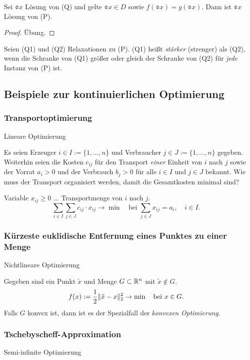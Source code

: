 \begin{thm}
  Sei $\obar{x}$ Lösung von (Q) und gelte $\obar{x} \in D$ sowie $f(\obar{x}) =
  g(\obar{x})$. Dann ist $\obar{x}$ Lösung von (P).
\end{thm}

\begin{proof}
  Übung.
\end{proof}

\begin{defn}
  Seien (Q1) und (Q2) Relaxationen zu (P). (Q1) heißt \emph{stärker} (strenger)
  als (Q2), wenn die Schranke von (Q1) größer oder gleich der Schranke von (Q2)
  für \emph{jede} Instanz von (P) ist.
\end{defn}

\subsection{Beispiele zur kontinuierlichen Optimierung}
\subsubsection{Transportoptimierung}
Lineare Optimierung

Es seien Erzeuger $i \in I := \{1, \ldots, n\}$ und Verbraucher $j \in J := \{1,
\ldots, n\}$ gegeben. Weiterhin seien die Kosten $c_{ij}$ für den Transport
\emph{einer} Einheit von $i$ nach $j$ sowie der Vorrat $a_i > 0$ und der
Verbrauch $b_j > 0$ für alle $i \in I$ und $j \in J$ bekannt. Wie muss der
Transport organisiert werden, damit die Gesamtkosten minimal sind?

Variable $x_{ij} \ge 0$ ... Transportmenge von $i$ nach $j$.
\[ \sum_{i \in I} \sum_{j \in J} c_{ij} \cdot x_{ij} \to \min \quad \text{bei }
  \sum_{j \in J} x_{ij} = a_i, \quad i \in I. \]

\subsubsection{Kürzeste euklidische Entfernung eines Punktes zu einer Menge}
Nichtlineare Optimierung

Gegeben sind ein Punkt $\tilde{x}$ und Menge $G \subset \mathbb{R}^n$ mit $\tilde{x}
\notin G$.
\[ f(x) := \frac{1}{2} \| \tilde{x} - x \|_2^2 \to \min \quad \text{bei } x \in
G. \]
Falls $G$ konvex ist, dann ist es der Spezialfall der \emph{konvexen
  Optimierung}.

\subsubsection{Tschebyscheff-Approximation}
Semi-infinite Optimierung

